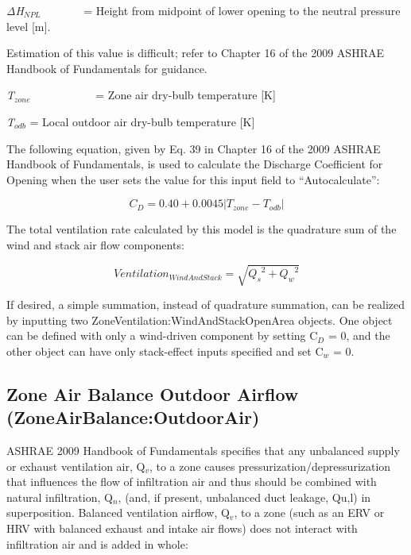 \emph{ΔH\(_{NPL}\)}~~~~~~~ = Height from midpoint of lower opening to the neutral pressure level {[}m{]}.

Estimation of this value is difficult; refer to Chapter 16 of the 2009 ASHRAE Handbook of Fundamentals for guidance.

\emph{T\(_{zone}\)}~~~~~~~~~~~ = Zone air dry-bulb temperature {[}K{]}

\emph{T\(_{odb}\)} = Local outdoor air dry-bulb temperature {[}K{]}

The following equation, given by Eq. 39 in Chapter 16 of the 2009 ASHRAE Handbook of Fundamentals, is used to calculate the Discharge Coefficient for Opening when the user sets the value for this input field to ``Autocalculate'':

\begin{equation}
{C_D} = 0.40 + 0.0045\left| {{T_{zone}} - {T_{odb}}} \right|
\end{equation}

The total ventilation rate calculated by this model is the quadrature sum of the wind and stack air flow components:

\begin{equation}
Ventilatio{n_{WindAndStack}} = \sqrt {{Q_s}^2 + {Q_w}^2}
\end{equation}

If desired, a simple summation, instead of quadrature summation, can be realized by inputting two ZoneVentilation:WindAndStackOpenArea objects. One object can be defined with only a wind-driven component by setting C\(_{D}\) = 0, and the other object can have only stack-effect inputs specified and set C\(_{w}\) = 0.

\subsection{Zone Air Balance Outdoor Airflow (ZoneAirBalance:OutdoorAir)}\label{zone-air-balance-outdoor-airflow-zoneairbalanceoutdoorair}

ASHRAE 2009 Handbook of Fundamentals specifies that any unbalanced supply or exhaust ventilation air, Q\(_{v}\), to a zone causes pressurization/depressurization that influences the flow of infiltration air and thus should be combined with natural infiltration, Q\(_{n}\), (and, if present, unbalanced duct leakage, Qu,l) in superposition. Balanced ventilation airflow, Q\(_{v}\), to a zone (such as an ERV or HRV with balanced exhaust and intake air flows) does not interact with infiltration air and is added in whole:

